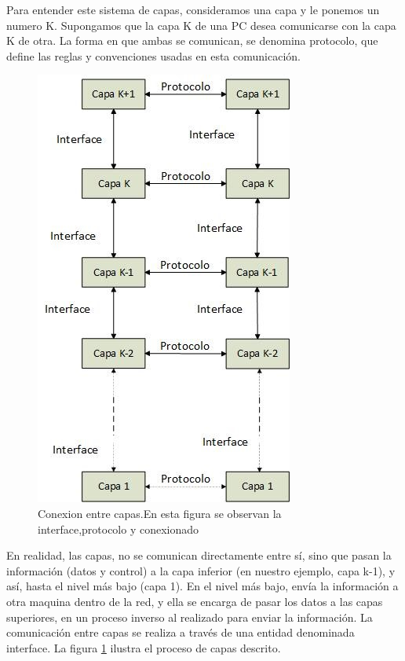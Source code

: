 Para entender este sistema de capas, consideramos una capa y le ponemos un numero K. Supongamos que la capa K de una PC desea comunicarse con la capa K de otra. La forma en que ambas se comunican, se denomina protocolo, que define las reglas y convenciones usadas en esta comunicación. 

\begin{figure}
	\centering 
	\includegraphics[scale=0.6]{modcap}
	\caption{Conexion entre capas.En esta figura se observan la interface,protocolo y conexionado}
	\label{fig:modOSI}	
\end{figure}
En realidad, las capas, no se comunican directamente entre sí, sino que pasan la información (datos y control) a la capa inferior (en nuestro ejemplo, capa k-1), y así, hasta el nivel más bajo (capa 1). En el nivel más bajo, envía la información a otra maquina dentro de la red, y ella se encarga de pasar los datos a las capas superiores, en un proceso inverso al realizado para enviar la información. La comunicación entre capas se realiza a través de una entidad denominada interface. La figura  \ref{fig:modOSI} ilustra el proceso de capas descrito.

